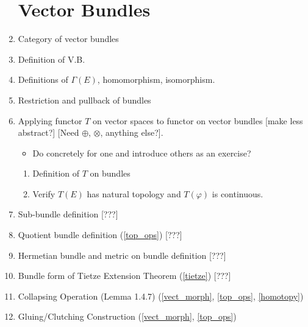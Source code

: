 \documentclass[12]{amsart}
\begin{document}
\begin{enumerate}
\section{Vector Bundles} %
    \item Category of vector bundles 
    \item Definition of V.B.
    \item Definitions of $\Gamma(E)$, homomorphism, isomorphism. \label{vect_morph}
    \item Restriction and pullback of bundles
    \item Applying functor $T$ on vector spaces to functor on vector bundles [make less abstract?] [Need $\oplus$, $\otimes$, anything else?].
        \begin{itemize}
            \item Do concretely for one and introduce others as an exercise?
        \end{itemize}
        \begin{enumerate}
            \item Definition of $T$ on bundles
            \item Verify $T(E)$ has natural topology and $T(\varphi)$ is continuous.
        \end{enumerate}
    \item Sub-bundle definition [???]
    \item Quotient bundle definition (\ref{top_ops}) [???]
    \item Hermetian bundle and metric on bundle definition [???]
    \item Bundle form of Tietze Extension Theorem (\ref{tietze}) \label{tietze_vb} [???]
    \item Collapsing Operation (Lemma 1.4.7) (\ref{vect_morph}, \ref{top_ops}, \ref{homotopy})
    \item Gluing/Clutching Construction (\ref{vect_morph}, \ref{top_ops})


\end{enumerate}
\end{document}
